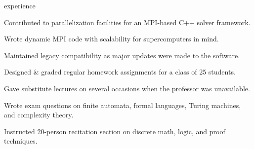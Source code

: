 \documentclass{cv}
\begin{document}

\begin{cvsection}{experience}
  {
    \item Contributed to parallelization facilities for an MPI-based C++ solver framework.
    \item Wrote dynamic MPI code with scalability for supercomputers in mind.
    \item Maintained legacy compatibility as major updates were made to the software.
  }
  {
    \item Designed \& graded regular homework assignments for a class of 25 students.
    \item Gave substitute lectures on several occasions when the professor was unavailable.
    \item Wrote exam questions on finite automata, formal languages, Turing machines, and complexity theory.
  }
  {
    \item Instructed 20-person recitation section on discrete math, logic, and proof techniques.
  }
\end{cvsection}
\end{document}
